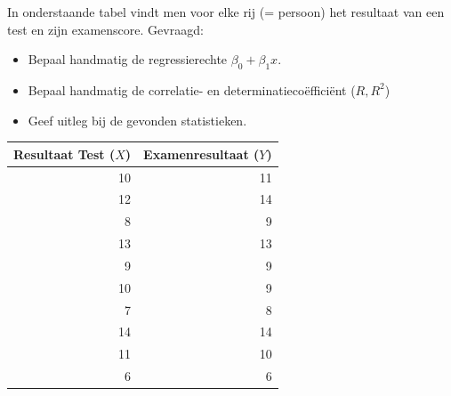 \begin{exercise}
	\label{ex:test-examen}
	In onderstaande tabel vindt men voor elke rij (= persoon) het resultaat van een test en zijn examenscore. Gevraagd:
\begin{itemize}
	\item Bepaal handmatig de regressierechte $\beta_{0} + \beta_{1} x$. 
	\item Bepaal handmatig de correlatie- en determinatieco\"effici\"ent ($R, R^{2}$) 
	\item Geef uitleg bij de gevonden statistieken.
\end{itemize}

	\centering
	\begin{tabular}{@{}rr@{}} \toprule
	Resultaat Test ($X$) & Examenresultaat ($Y$) \\
		\midrule
		10 & 11 \\
		12 & 14 \\
		8 & 9 \\
		13 & 13 \\
		9 & 9 \\
		10 &  9 \\
		7 & 8 \\
		14 & 14 \\
		11 & 10 \\
		6 & 6  \\
		\bottomrule
	\end{tabular}
	\label{tab:testExamen}
\end{exercise}


